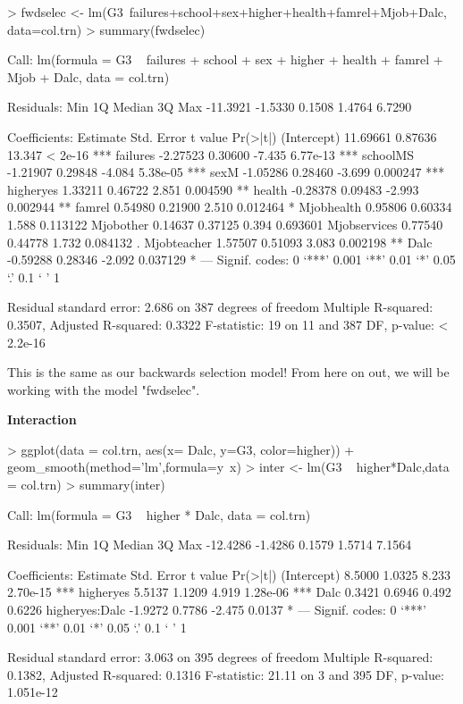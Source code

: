 \documentclass{article}
\begin{document}
\begin{Schunk}
\begin{Sinput}
> fwdselec <- lm(G3~failures+school+sex+higher+health+famrel+Mjob+Dalc, data=col.trn)
> summary(fwdselec)
\end{Sinput}
\begin{Soutput}
Call:
lm(formula = G3 ~ failures + school + sex + higher + health + 
    famrel + Mjob + Dalc, data = col.trn)

Residuals:
     Min       1Q   Median       3Q      Max 
-11.3921  -1.5330   0.1508   1.4764   6.7290 

Coefficients:
             Estimate Std. Error t value Pr(>|t|)    
(Intercept)  11.69661    0.87636  13.347  < 2e-16 ***
failures     -2.27523    0.30600  -7.435 6.77e-13 ***
schoolMS     -1.21907    0.29848  -4.084 5.38e-05 ***
sexM         -1.05286    0.28460  -3.699 0.000247 ***
higheryes     1.33211    0.46722   2.851 0.004590 ** 
health       -0.28378    0.09483  -2.993 0.002944 ** 
famrel        0.54980    0.21900   2.510 0.012464 *  
Mjobhealth    0.95806    0.60334   1.588 0.113122    
Mjobother     0.14637    0.37125   0.394 0.693601    
Mjobservices  0.77540    0.44778   1.732 0.084132 .  
Mjobteacher   1.57507    0.51093   3.083 0.002198 ** 
Dalc         -0.59288    0.28346  -2.092 0.037129 *  
---
Signif. codes:  0 ‘***’ 0.001 ‘**’ 0.01 ‘*’ 0.05 ‘.’ 0.1 ‘ ’ 1

Residual standard error: 2.686 on 387 degrees of freedom
Multiple R-squared:  0.3507,	Adjusted R-squared:  0.3322 
F-statistic:    19 on 11 and 387 DF,  p-value: < 2.2e-16
\end{Soutput}
\end{Schunk}

This is the same as our backwards selection model! From here on out, we will be working with the model "fwdselec".


\textbf{Interaction}

\begin{Schunk}
\begin{Sinput}
> ggplot(data = col.trn, aes(x= Dalc, y=G3, color=higher)) + geom_smooth(method='lm',formula=y~x)
> inter <- lm(G3 ~ higher*Dalc,data = col.trn)
> summary(inter)
\end{Sinput}
\begin{Soutput}
Call:
lm(formula = G3 ~ higher * Dalc, data = col.trn)

Residuals:
     Min       1Q   Median       3Q      Max 
-12.4286  -1.4286   0.1579   1.5714   7.1564 

Coefficients:
               Estimate Std. Error t value Pr(>|t|)    
(Intercept)      8.5000     1.0325   8.233 2.70e-15 ***
higheryes        5.5137     1.1209   4.919 1.28e-06 ***
Dalc             0.3421     0.6946   0.492   0.6226    
higheryes:Dalc  -1.9272     0.7786  -2.475   0.0137 *  
---
Signif. codes:  0 ‘***’ 0.001 ‘**’ 0.01 ‘*’ 0.05 ‘.’ 0.1 ‘ ’ 1

Residual standard error: 3.063 on 395 degrees of freedom
Multiple R-squared:  0.1382,	Adjusted R-squared:  0.1316 
F-statistic: 21.11 on 3 and 395 DF,  p-value: 1.051e-12
\end{Soutput}
\end{Schunk}
\end{document}
